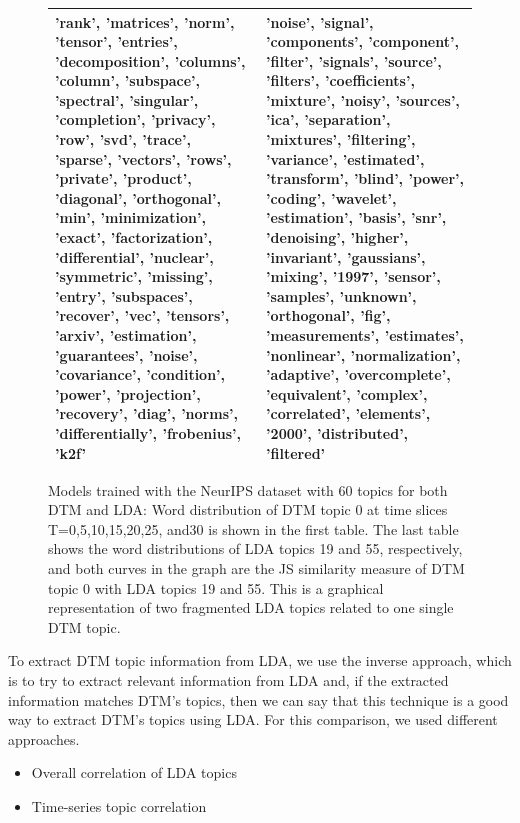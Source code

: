 \begin{figure}[t]
\begin{center}
\begin{tabular}{|p{7cm}|p{7cm}|}
'rank', 'matrices', 'norm', 'tensor', 'entries', 'decomposition', 'columns', 'column', 'subspace', 'spectral', 'singular', 'completion', 'privacy', 'row', 'svd', 'trace', 'sparse', 'vectors', 'rows', 'private', 'product', 'diagonal', 'orthogonal', 'min', 'minimization', 'exact', 'factorization', 'differential', 'nuclear', 'symmetric', 'missing', 'entry', 'subspaces', 'recover', 'vec', 'tensors', 'arxiv', 'estimation', 'guarantees', 'noise', 'covariance', 'condition', 'power', 'projection', 'recovery', 'diag', 'norms', 'differentially', 'frobenius', 'k2f'
&
'noise', 'signal', 'components', 'component', 'filter', 'signals', 'source', 'filters', 'coefficients', 'mixture', 'noisy', 'sources', 'ica', 'separation', 'mixtures', 'filtering', 'variance', 'estimated', 'transform', 'blind', 'power', 'coding', 'wavelet', 'estimation', 'basis', 'snr', 'denoising', 'higher', 'invariant', 'gaussians', 'mixing', '1997', 'sensor', 'samples', 'unknown', 'orthogonal', 'fig', 'measurements', 'estimates', 'nonlinear', 'normalization', 'adaptive', 'overcomplete', 'equivalent', 'complex', 'correlated', 'elements', '2000', 'distributed', 'filtered'
\\ \hline

\end{tabular}
\caption{Models trained with the NeurIPS dataset with 60 topics for both DTM and LDA: Word distribution of DTM topic 0 at time slices T=0,5,10,15,20,25, and30 is shown in the first table. The last table shows the word distributions of LDA topics 19 and 55, respectively, and both curves in the graph are the JS similarity measure of DTM topic 0 with LDA topics 19 and 55. This is a graphical representation of two fragmented LDA topics related to one single DTM topic.}
\label{fig:fragmentation}
\end{center}
\end{figure}

To extract DTM topic information from LDA, we use the inverse approach, which is to try to extract relevant information from LDA and, if the extracted information matches DTM's topics, then we can say that this technique is a good way to extract DTM's topics using LDA. For this comparison, we used different approaches.

\begin{itemize}
\item Overall correlation of LDA topics
\item Time-series topic correlation
\end{itemize}

